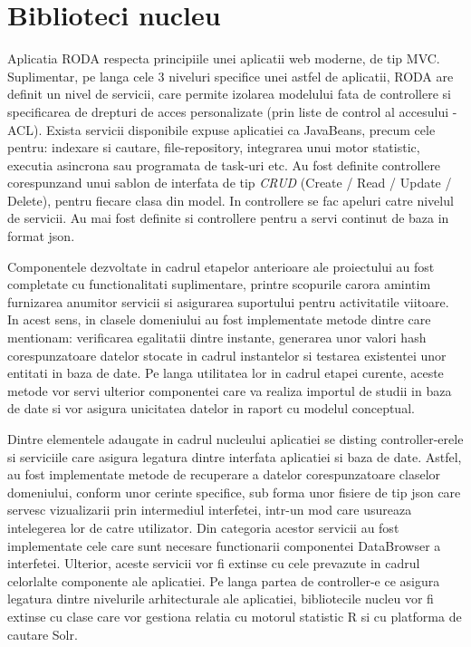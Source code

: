 \section{Biblioteci nucleu}

Aplicatia RODA respecta principiile unei aplicatii web moderne, de tip MVC. Suplimentar, pe langa cele 3 niveluri specifice unei astfel de aplicatii, RODA are definit un nivel de servicii, care permite izolarea modelului fata de controllere si specificarea de drepturi de acces personalizate (prin liste de control al accesului - ACL). Exista servicii disponibile expuse aplicatiei ca JavaBeans, precum cele pentru: 
indexare si cautare, file-repository, integrarea unui motor statistic, executia asincrona sau programata de task-uri etc. Au fost definite controllere corespunzand unui sablon de interfata de tip \emph{CRUD}
(Create / Read / Update / Delete), pentru fiecare clasa din model. In controllere se fac apeluri catre nivelul de servicii. Au mai fost definite si controllere pentru a servi continut de baza in format json.

Componentele dezvoltate in cadrul etapelor anterioare ale proiectului au fost completate cu functionalitati suplimentare, printre scopurile carora amintim furnizarea anumitor servicii si asigurarea suportului pentru activitatile viitoare. In acest sens, in clasele domeniului au fost implementate metode dintre care mentionam: verificarea egalitatii dintre instante, generarea unor valori hash corespunzatoare datelor stocate in cadrul instantelor si testarea existentei unor entitati in baza de date. Pe langa utilitatea lor in cadrul etapei curente, aceste metode vor servi ulterior componentei care va realiza importul de studii in baza de date si vor asigura unicitatea datelor in raport cu modelul conceptual. 

Dintre elementele adaugate in cadrul nucleului aplicatiei se disting controller-erele si serviciile care asigura legatura dintre interfata aplicatiei si baza de date. Astfel, au fost implementate metode de recuperare a datelor corespunzatoare claselor domeniului, conform unor cerinte specifice, sub forma unor fisiere de tip json care servesc vizualizarii prin intermediul interfetei, intr-un mod care usureaza intelegerea lor de catre utilizator. Din categoria acestor servicii au fost implementate cele care sunt necesare functionarii componentei DataBrowser a interfetei. Ulterior, aceste servicii vor fi extinse cu cele prevazute in cadrul celorlalte componente ale aplicatiei. Pe langa partea de controller-e ce asigura legatura dintre nivelurile arhitecturale ale aplicatiei, bibliotecile nucleu vor fi extinse cu clase care vor gestiona relatia cu motorul statistic R si cu platforma de cautare Solr.




